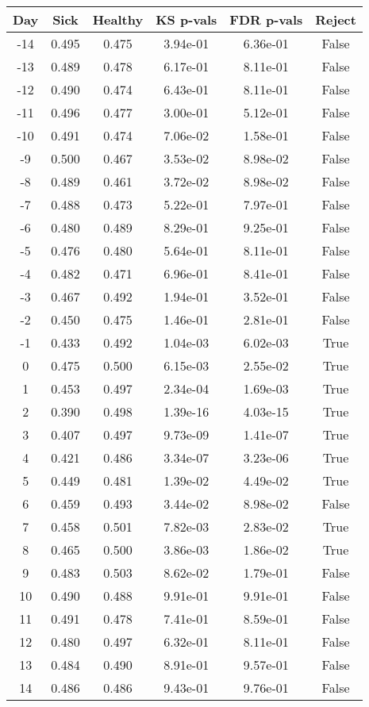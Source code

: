 \begin{tabular}{c|c|c|c|c|c}
Day &  Sick & Healthy &  KS p-vals & FDR p-vals & Reject\\
\hline
-14 & 0.495 &   0.475 &   3.94e-01 &   6.36e-01 &  False\\
-13 & 0.489 &   0.478 &   6.17e-01 &   8.11e-01 &  False\\
-12 & 0.490 &   0.474 &   6.43e-01 &   8.11e-01 &  False\\
-11 & 0.496 &   0.477 &   3.00e-01 &   5.12e-01 &  False\\
-10 & 0.491 &   0.474 &   7.06e-02 &   1.58e-01 &  False\\
 -9 & 0.500 &   0.467 &   3.53e-02 &   8.98e-02 &  False\\
 -8 & 0.489 &   0.461 &   3.72e-02 &   8.98e-02 &  False\\
 -7 & 0.488 &   0.473 &   5.22e-01 &   7.97e-01 &  False\\
 -6 & 0.480 &   0.489 &   8.29e-01 &   9.25e-01 &  False\\
 -5 & 0.476 &   0.480 &   5.64e-01 &   8.11e-01 &  False\\
 -4 & 0.482 &   0.471 &   6.96e-01 &   8.41e-01 &  False\\
 -3 & 0.467 &   0.492 &   1.94e-01 &   3.52e-01 &  False\\
 -2 & 0.450 &   0.475 &   1.46e-01 &   2.81e-01 &  False\\
 -1 & 0.433 &   0.492 &   1.04e-03 &   6.02e-03 &   True\\
  0 & 0.475 &   0.500 &   6.15e-03 &   2.55e-02 &   True\\
  1 & 0.453 &   0.497 &   2.34e-04 &   1.69e-03 &   True\\
  2 & 0.390 &   0.498 &   1.39e-16 &   4.03e-15 &   True\\
  3 & 0.407 &   0.497 &   9.73e-09 &   1.41e-07 &   True\\
  4 & 0.421 &   0.486 &   3.34e-07 &   3.23e-06 &   True\\
  5 & 0.449 &   0.481 &   1.39e-02 &   4.49e-02 &   True\\
  6 & 0.459 &   0.493 &   3.44e-02 &   8.98e-02 &  False\\
  7 & 0.458 &   0.501 &   7.82e-03 &   2.83e-02 &   True\\
  8 & 0.465 &   0.500 &   3.86e-03 &   1.86e-02 &   True\\
  9 & 0.483 &   0.503 &   8.62e-02 &   1.79e-01 &  False\\
 10 & 0.490 &   0.488 &   9.91e-01 &   9.91e-01 &  False\\
 11 & 0.491 &   0.478 &   7.41e-01 &   8.59e-01 &  False\\
 12 & 0.480 &   0.497 &   6.32e-01 &   8.11e-01 &  False\\
 13 & 0.484 &   0.490 &   8.91e-01 &   9.57e-01 &  False\\
 14 & 0.486 &   0.486 &   9.43e-01 &   9.76e-01 &  False\\
\end{tabular}